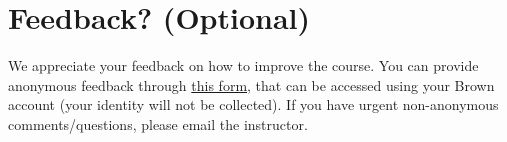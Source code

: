 \documentclass{csci1430}
\begin{document}
\pagebreak
\section*{Feedback? (Optional)}
We appreciate your feedback on how to improve the course. You can provide anonymous feedback through \href{https://forms.gle/Eu5jJbDUmLknAyJV9}{this form}, that can be accessed using your Brown account (your identity will not be collected). If you have urgent non-anonymous comments/questions, please email the instructor.


\end{document}
